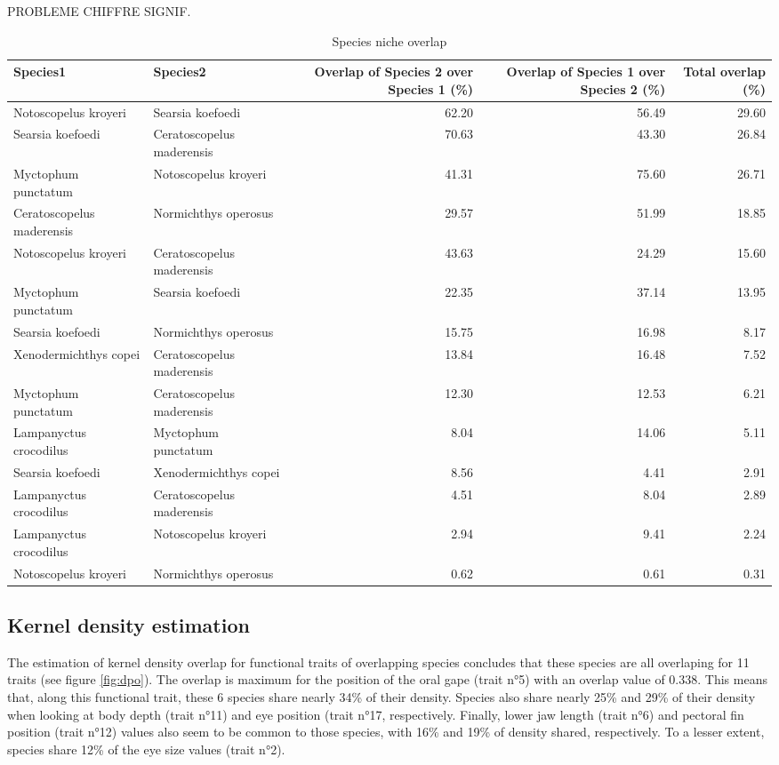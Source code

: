PROBLEME CHIFFRE SIGNIF.

\begin{table}[ht]
\centering
\label{table:ell_ovlp}
\caption{Species niche overlap}
\begin{adjustbox}{max width=1.1\textwidth,center}
\begin{tabular}{llrrr}
  \hline
Species1 & Species2 & Overlap of Species 2 over Species 1 (\%) & Overlap of Species 1 over Species 2 (\%) & Total overlap (\%)\\ 
  \hline
Notoscopelus kroyeri & Searsia koefoedi & 62.20 & 56.49 & 29.60 \\ 
  Searsia koefoedi & Ceratoscopelus maderensis & 70.63 & 43.30 & 26.84 \\ 
  Myctophum punctatum & Notoscopelus kroyeri & 41.31 & 75.60 & 26.71 \\ 
  Ceratoscopelus maderensis & Normichthys operosus & 29.57 & 51.99 & 18.85 \\ 
  Notoscopelus kroyeri & Ceratoscopelus maderensis & 43.63 & 24.29 & 15.60 \\ 
  Myctophum punctatum & Searsia koefoedi & 22.35 & 37.14 & 13.95 \\ 
  Searsia koefoedi & Normichthys operosus & 15.75 & 16.98 & 8.17 \\ 
  Xenodermichthys copei & Ceratoscopelus maderensis & 13.84 & 16.48 & 7.52 \\ 
  Myctophum punctatum & Ceratoscopelus maderensis & 12.30 & 12.53 & 6.21 \\ 
  Lampanyctus crocodilus & Myctophum punctatum & 8.04 & 14.06 & 5.11 \\ 
  Searsia koefoedi & Xenodermichthys copei & 8.56 & 4.41 & 2.91 \\ 
  Lampanyctus crocodilus & Ceratoscopelus maderensis & 4.51 & 8.04 & 2.89 \\ 
  Lampanyctus crocodilus & Notoscopelus kroyeri & 2.94 & 9.41 & 2.24 \\ 
  Notoscopelus kroyeri & Normichthys operosus & 0.62 & 0.61 & 0.31 \\ 
   \hline
\end{tabular}
\end{adjustbox}
\end{table}


\subsection{Kernel density estimation}
The estimation of kernel density overlap for functional traits of overlapping species concludes that these species are all overlaping for 11 traits (see figure \ref{fig:dpo}). The overlap is maximum for the position of the oral gape (trait n°5) with an overlap value of 0.338. This means that, along this functional trait, these 6 species share nearly 34\% of their density. Species also share nearly 25\% and 29\% of their density when looking at body depth (trait n°11) and eye position (trait n°17, respectively. Finally, lower jaw length (trait n°6) and pectoral fin position (trait n°12) values also seem to be common to those species, with 16\% and 19\% of density shared, respectively. To a lesser extent, species share 12\% of the eye size values (trait n°2).

